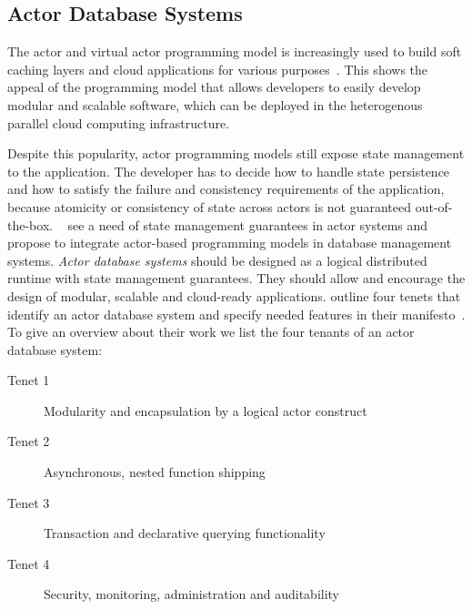   \subsection{Actor Database Systems}
  The actor and virtual actor programming model is increasingly used to build soft caching layers and cloud applications for various purposes~\cite{erlang_uses,akka_uses,orleans_uses}.
  This shows the appeal of the programming model that allows developers to easily develop modular and scalable software, which can be deployed in the heterogenous parallel cloud computing infrastructure.
  
  Despite this popularity, actor programming models still expose state management to the application.
  The developer has to decide how to handle state persistence and how to satisfy the failure and consistency requirements of the application, because atomicity or consistency of state across actors is not guaranteed out-of-the-box.
  \citeauthor{manifesto}~\cite{manifesto} see a need of state management guarantees in actor systems and propose to integrate actor-based programming models in database management systems.
  \textit{Actor database systems} should be designed as a logical distributed runtime with state management guarantees.
  They should allow and encourage the design of modular, scalable and cloud-ready applications.
  \citeauthor{manifesto} outline four tenets that identify an actor database system and specify needed features in their manifesto~\cite{manifesto}.
  To give an overview about their work we list the four tenants of an actor database system:
  \begin{description}
    \item[Tenet 1] Modularity and encapsulation by a logical actor construct
    \item[Tenet 2] Asynchronous, nested function shipping
    \item[Tenet 3] Transaction and declarative querying functionality
    \item[Tenet 4] Security, monitoring, administration and auditability
  \end{description}

